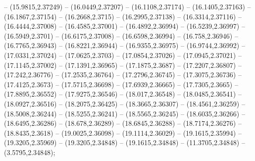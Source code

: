 {-- (15.9815,2.37249) -- (16.0449,2.37207) -- (16.1108,2.37174) -- (16.1405,2.37163) -- (16.1867,2.37154) -- (16.2668,2.3715) -- (16.2995,2.37138) -- (16.3314,2.37116) -- (16.4444,2.37008) -- (16.4585,2.37001) -- (16.4892,2.36994) --
(16.5239,2.36997) -- (16.5949,2.3701) -- (16.6175,2.37008) -- (16.6598,2.36994) -- (16.758,2.36946) -- (16.7765,2.36943) -- (16.8221,2.36944) -- (16.9355,2.36975) -- (16.9744,2.36992) -- (17.0331,2.37024) -- (17.0625,2.3703) -- (17.0854,2.37026) --
(17.0945,2.37021) -- (17.1145,2.37002) -- (17.1391,2.36965) -- (17.1875,2.3687) -- (17.2207,2.36807) -- (17.242,2.36776) -- (17.2535,2.36764) -- (17.2796,2.36745) -- (17.3075,2.36736) -- (17.4125,2.3673) -- (17.5715,2.36698) -- (17.6939,2.36665) --
(17.7305,2.3665) -- (17.8895,2.36552) -- (17.9275,2.36546) -- (18.017,2.36548) -- (18.0485,2.36541) -- (18.0927,2.36516) -- (18.2075,2.36425) -- (18.3665,2.36307) -- (18.4561,2.36259) -- (18.5008,2.36244) -- (18.5255,2.36241) -- (18.5565,2.36245) --
(18.6035,2.36266) -- (18.6495,2.36286) -- (18.678,2.36289) -- (18.6845,2.36288) -- (18.7174,2.36276) -- (18.8435,2.3618) -- (19.0025,2.36098) -- (19.1114,2.36029) -- (19.1615,2.35994) -- (19.3205,2.35969) -- (19.3205,2.34848) -- (19.1615,2.34848) -- (11.3705,2.34848) -- (3.5795,2.34848);

} {

}
